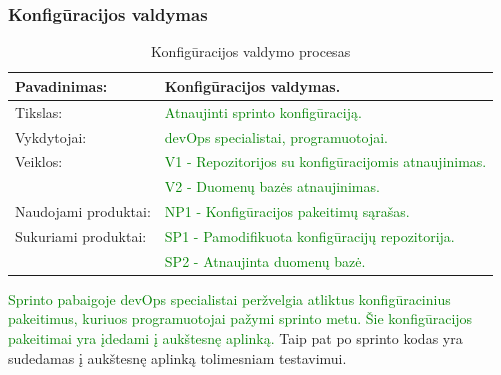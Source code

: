 \documentclass{VUMIFPSkursinis}
\begin{document}
	\subsubsection{Konfigūracijos valdymas}
	\begin{center}
		\begin{table}[ht]
			\caption{Konfigūracijos valdymo procesas}
			\begin{tabular}{ | l | l | }
				\hline
				Pavadinimas:		& Konfigūracijos valdymas.				\\ \hline
				Tikslas: 		& \textcolor{green}{Atnaujinti sprinto konfigūraciją.}			\\ \hline
				Vykdytojai:		& \textcolor{green}{devOps specialistai, programuotojai.}			\\ \hline
				Veiklos:		& \textcolor{green}{V1 - Repozitorijos su konfigūracijomis atnaujinimas.}	\\
							&\textcolor{green}{ V2 - Duomenų bazės atnaujinimas.	}		\\ \hline
				Naudojami produktai:	& \textcolor{green}{NP1 - Konfigūracijos pakeitimų sąrašas.	}	\\ \hline
				Sukuriami produktai:	& \textcolor{green}{SP1 - Pamodifikuota konfigūracijų repozitorija. }	\\
							& \textcolor{green}{SP2 - Atnaujinta duomenų bazė. }			\\ \hline
			\end{tabular}
		\end{table}
	\end{center}
		\textcolor{green}{Sprinto pabaigoje devOps specialistai peržvelgia atliktus konfigūracinius pakeitimus, kuriuos programuotojai pažymi sprinto metu.
		Šie konfigūracijos pakeitimai yra įdedami į aukštesnę aplinką.} Taip pat po sprinto kodas yra sudedamas į aukštesnę aplinką tolimesniam testavimui.
\end{document}
